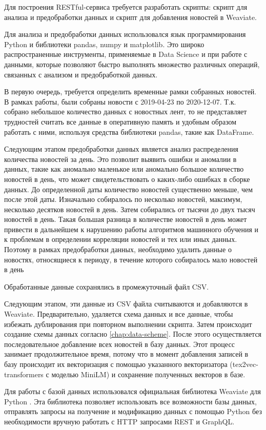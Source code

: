 Для построения RESTful-сервиса требуется разработать скрипты: скрипт для анализа и предобработки данных и скрипт для добавления новостей в Weaviate.

Для анализа и предобработки данных использовался язык программирования Python и библиотеки pandas, numpy и matplotlib. Это широко распространенные инструменты, применяемые в Data Science и при работе с данными, которые позволяют быстро выполнять множество различных операций, связанных с анализом и предобработкой данных.

В первую очередь, требуется определить временные рамки собранных новостей. В рамках работы, были собраны новости с 2019-04-23 по 2020-12-07. Т.к. собрано небольшое количество данных с новостных лент, то не представляет трудностей считать все данные в оперативную память и удобным образом работать с ними, используя средства библиотеки pandas, такие как DataFrame.

Следующим этапом предобработки данных является анализ распределения количества новостей за день. Это позволит выявить ошибки и аномалии в данных, такие как аномально маленькое или аномально большое количество новостей в день, что может свидетельствовать о каких-либо ошибках в сборке данных. До определенной даты количество новостей существенно меньше, чем после этой даты. Изначально собиралось по несколько новостей, максимум, несколько десятков новостей в день. Затем собирались от тысячи до двух тысяч новостей в день. Такая большая разница в количестве новостей в день может привести в дальнейшем к нарушению работы алгоритмов машинного обучения и к проблемам в определении корреляции новостей и тех или иных данных. Поэтому в рамках предобработки данных, необходимо удалить данные о новостях, относящиеся к периоду, в течение которого собиралось мало новостей в день

Обработанные данные сохранялись в промежуточный файл CSV.

Следующим этапом, эти данные из CSV файла считываются и добавляются в Weaviate. Предварительно, удаляется схема данных и все данные, чтобы избежать дублирования при повторном выполнении скрипта. Затем происходит создание схемы данных согласно \ref{chap:data-scheme}. После этого осуществляется последовательное добавление всех новостей в базу данных. Этот процесс занимает продолжительное время, потому что в момент добавления записей в базу происходит их векторизация с помощью указанного векторизатора (tex2vec-transformers с моделью MiniLM) и сохранение полученных векторов в базе.

Для работы с базой данных использовался официальная библиотека Weaviate для Python \cite{weaviate-python}. Эта библиотека позволяет использовать все возможности базы данных, отправлять запросы на получение и модификацию данных с помощью Python без необходимости вручную работать с HTTP запросами REST и GraphQL.

